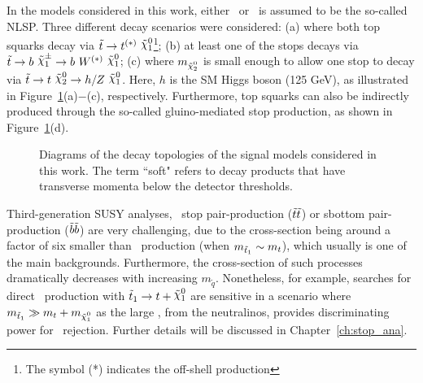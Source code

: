 				In the models considered in this work, either \ninotwo\ or \chinoonepm\ is assumed to be the so-called \ac{NLSP}. Three different decay scenarios were considered: (a) where both top squarks decay via $\stop\rightarrow t^{(*)}\ \ninoone$\footnote{The symbol (*) indicates the off-shell production}; (b) at least one of the stops decays via $\stop\rightarrow b\ \chinoonepm \rightarrow b\ \Wboson^{(*)}\ \ninoone$; (c) where $m_{\ninotwo}$ is small enough to allow one stop to decay via $\stop\to t\ \ninotwo \to h/Z\ \ninoone$. Here, $h$ is the \ac{SM} Higgs boson (125 GeV), as illustrated in Figure~\ref{fig:feynDiagModels}(a)$-$(c), respectively. Furthermore, top squarks can also be indirectly produced through the so-called gluino-mediated stop production, as shown in Figure~\ref{fig:feynDiagModels}(d).

				\begin{figure}[!htb]
					\begin{center}
						\hspace{0.05\textwidth}
						\hspace{0.05\textwidth}
						\hspace{0.05\textwidth}
						\hspace{0.05\textwidth}
					\end{center}
					\caption{Diagrams of the decay topologies of the signal models considered in this work. The term ``soft" refers to decay products that have transverse momenta below the detector thresholds.}
					\label{fig:feynDiagModels}
				\end{figure}

				Third-generation \ac{SUSY} analyses, \eg\ stop pair-production ($\tilde{t}\tilde{t}$) or sbottom pair-production ($\tilde{b}\tilde{b}$) are very challenging, due to the cross-section being around a factor of six smaller than \ttbar\ production (when $m_{\tilde{t}_1} \sim m_t$), which usually is one of the main backgrounds. Furthermore, the cross-section of such processes dramatically decreases with increasing $m_{\tilde{q}}$. Nonetheless, for example, searches for direct \stopone\ production with $\stopone \ra t + \ninoone$ are sensitive in a scenario where $m_{\stopone} \gg m_t + m_{\ninoone}$ as the large \met, from the neutralinos, provides discriminating power for \ttbar\ rejection. Further details will be discussed in Chapter~\ref{ch:stop_ana}.
				